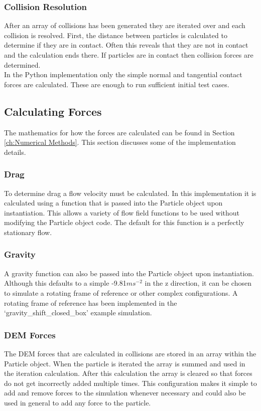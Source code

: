 \documentclass[a4paper,11pt,titlepage]{report}
\begin{document}
\subsubsection{Collision Resolution}
After an array of collisions has been generated they are iterated over and each collision is resolved. First, the distance between particles is calculated to determine if they are in contact. Often this reveals that they are not in contact and the calculation ends there. If particles are in contact then collision forces are determined.
\\In the Python implementation only the simple normal and tangential contact forces are calculated. These are enough to run sufficient initial test cases.
\subsection{Calculating Forces}
The mathematics for how the forces are calculated can be found in Section \ref{ch:Numerical Methods}. This section discusses some of the implementation details.
\subsubsection{Drag}
To determine drag a flow velocity must be calculated. In this implementation it is calculated using a function that is passed into the Particle object upon instantiation. This allows a variety of flow field functions to be used without modifying the Particle object code. The default for this function is a perfectly stationary flow.
\subsubsection{Gravity}
A gravity function can also be passed into the Particle object upon instantiation. Although this defaults to a simple -9.81$ms^{-2}$ in the z direction, it can be chosen to simulate a rotating frame of reference or other complex configurations. A rotating frame of reference has been implemented in the `gravity\_shift\_closed\_box' example simulation\cite{DEMApples}.
\subsubsection{DEM Forces}
The DEM forces that are calculated in collisions are stored in an array within the Particle object. When the particle is iterated the array is summed and used in the iteration calculation. After this calculation the array is cleared so that forces do not get incorrectly added multiple times. This configuration makes it simple to add and remove forces to the simulation whenever necessary and could also be used in general to add any force to the particle.
\end{document}
